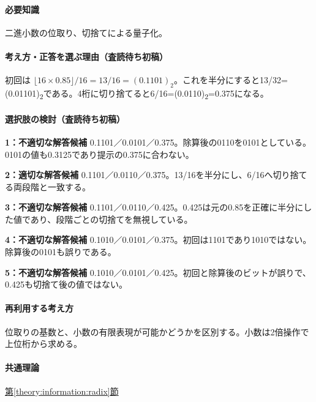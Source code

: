 \paragraph{必要知識} 二進小数の位取り、切捨てによる量子化。

\paragraph{考え方・正答を選ぶ理由（査読待ち初稿）} 初回は \(\lfloor16\times0.85\rfloor/16=13/16=(0.1101)_2\)。これを半分にすると13/32=\allowbreak{}(0.01101)\textsubscript{2}である。4桁に切り捨てると6/16=\allowbreak{}(0.0110)\textsubscript{2}=0.375になる。

\paragraph{選択肢の検討（査読待ち初稿）}\mbox{}\par

\noindent\textbf{1：不適切な解答候補} 0.1101／0.0101／0.375。除算後の0110を0101としている。0101の値も0.3125であり提示の0.375に合わない。\par

\noindent\textbf{2：適切な解答候補} 0.1101／0.0110／0.375。13/16を半分にし、6/16へ切り捨てる両段階と一致する。\par

\noindent\textbf{3：不適切な解答候補} 0.1101／0.0110／0.425。0.425は元の0.85を正確に半分にした値であり、段階ごとの切捨てを無視している。\par

\noindent\textbf{4：不適切な解答候補} 0.1010／0.0101／0.375。初回は1101であり1010ではない。除算後の0101も誤りである。\par

\noindent\textbf{5：不適切な解答候補} 0.1010／0.0101／0.425。初回と除算後のビットが誤りで、0.425も切捨て後の値ではない。\par

\paragraph{再利用する考え方} 位取りの基数と、小数の有限表現が可能かどうかを区別する。小数は2倍操作で上位桁から求める。

\paragraph{共通理論} \hyperref[theory:information:radix]{第\ref*{theory:information:radix}節}

